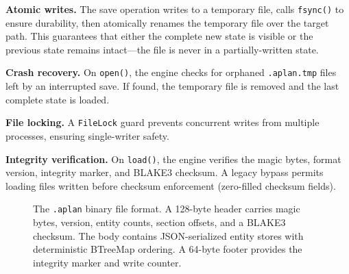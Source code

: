 \documentclass[10pt, twocolumn]{article}
\begin{document}
\textbf{Atomic writes.} The save operation writes to a temporary file, calls \texttt{fsync()} to ensure durability, then atomically renames the temporary file over the target path. This guarantees that either the complete new state is visible or the previous state remains intact---the file is never in a partially-written state.

\textbf{Crash recovery.} On \texttt{open()}, the engine checks for orphaned \texttt{.aplan.tmp} files left by an interrupted save. If found, the temporary file is removed and the last complete state is loaded.

\textbf{File locking.} A \texttt{FileLock} guard prevents concurrent writes from multiple processes, ensuring single-writer safety.

\textbf{Integrity verification.} On \texttt{load()}, the engine verifies the magic bytes, format version, integrity marker, and BLAKE3 checksum. A legacy bypass permits loading files written before checksum enforcement (zero-filled checksum fields).

\begin{figure}[t]
\centering
{}
\caption{The \texttt{.aplan} binary file format. A 128-byte header carries magic bytes, version, entity counts, section offsets, and a BLAKE3 checksum. The body contains JSON-serialized entity stores with deterministic BTreeMap ordering. A 64-byte footer provides the integrity marker and write counter.}
\label{fig:format}
\end{figure}
\end{document}
